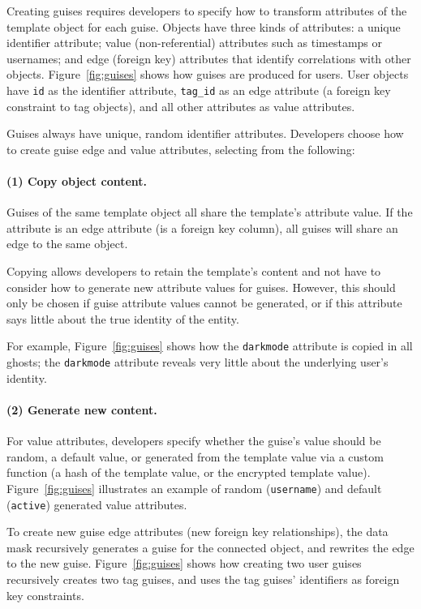 Creating guises requires developers to specify how to transform attributes of the template
object for each guise.
%
Objects have three kinds of attributes: a unique identifier attribute; value
(non-referential) attributes such as timestamps or usernames; and edge (\eg foreign key)
attributes that identify correlations with other objects.
%
Figure~\ref{fig:guises} shows how guises are produced for users. User objects have \texttt{id} as 
the identifier attribute, 
\texttt{tag\_id} as an edge attribute (a foreign key constraint to tag objects), 
and all other attributes as value attributes.

Guises always have unique, random identifier attributes.
Developers choose how to create guise edge and value attributes, selecting from the following:

\paragraph{(1) Copy object content.} Guises of the same template object all share the template's
    attribute value. If the attribute is an edge attribute (\eg is a foreign key column), 
    all guises will share an edge to the same object.

    Copying allows developers to retain the template's content and not have to
    consider how to generate new attribute values for guises. However, 
    this should only be chosen if guise attribute values cannot be generated, or if this
    attribute says little about the true identity of the entity. 

    For example, Figure~\ref{fig:guises} shows how the \texttt{darkmode} attribute is copied in
    all ghosts; the \texttt{darkmode} attribute reveals very little about the underlying user's
    identity.

\paragraph{(2) Generate new content.}
        For value attributes, developers specify whether the guise's value should be random,
        a default value, or generated from the template value via a custom function (\eg a hash of
        the template value, or the encrypted template value). Figure~\ref{fig:guises} illustrates
        an example of random (\texttt{username}) and default (\texttt{active}) generated value attributes.

        To create new guise edge attributes (\eg new foreign key relationships), the data mask
        recursively generates a guise for the connected object, and rewrites the edge to the new
        guise.  Figure~\ref{fig:guises} shows how creating two user guises recursively creates two
        tag guises, and uses the tag guises' identifiers as foreign key constraints.

